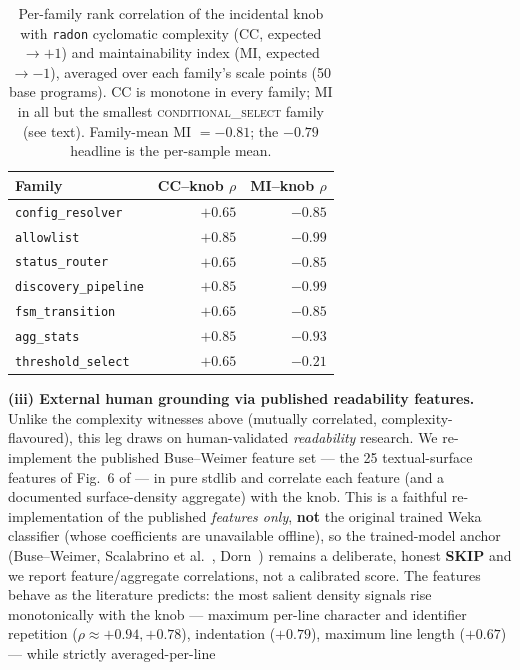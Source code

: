 \documentclass[11pt]{article}
\begin{document}
\begin{table}[t]\centering\small
\begin{tabular}{lrr}
\toprule
Family & CC--knob $\rho$ & MI--knob $\rho$ \\
\midrule
\texttt{config\_resolver}    & $+0.65$ & $-0.85$ \\
\texttt{allowlist}           & $+0.85$ & $-0.99$ \\
\texttt{status\_router}      & $+0.65$ & $-0.85$ \\
\texttt{discovery\_pipeline} & $+0.85$ & $-0.99$ \\
\texttt{fsm\_transition}     & $+0.65$ & $-0.85$ \\
\texttt{agg\_stats}          & $+0.85$ & $-0.93$ \\
\texttt{threshold\_select}   & $+0.65$ & $-0.21$ \\
\bottomrule
\end{tabular}
\caption{Per-family rank correlation of the incidental knob with \texttt{radon}
cyclomatic complexity (CC, expected ${\to}{+}1$) and maintainability index (MI, expected
${\to}{-}1$), averaged over each family's scale points (50 base programs). CC is monotone
in every family; MI in all but the smallest \textsc{conditional\_select} family (see text).
Family-mean MI $=-0.81$; the $-0.79$ headline is the per-sample mean.}\label{tab:perfamily}
\end{table} \textbf{(iii) External human grounding via published readability features.}
Unlike the complexity witnesses above (mutually correlated, complexity-flavoured), this
leg draws on human-validated \emph{readability} research. We re-implement the published
Buse--Weimer feature set --- the 25 textual-surface features of Fig.~6 of
\citet{buse-weimer-2010-learning} --- in pure stdlib and correlate each feature (and a
documented surface-density aggregate) with the knob. This is a faithful re-implementation
of the published \emph{features only}, \textbf{not} the original trained Weka classifier
(whose coefficients are unavailable offline), so the trained-model anchor (Buse--Weimer,
Scalabrino et al.~\citep{scalabrino-etal-2018-comprehensive},
Dorn~\citep{dorn-2012-general}) remains a deliberate, honest \textbf{SKIP} and we report
feature/aggregate correlations, not a calibrated score. The features behave as the
literature predicts: the most salient density signals rise monotonically with the knob ---
maximum per-line character and identifier repetition ($\rho\approx+0.94,+0.78$),
indentation ($+0.79$), maximum line length ($+0.67$) --- while strictly averaged-per-line
\end{document}
